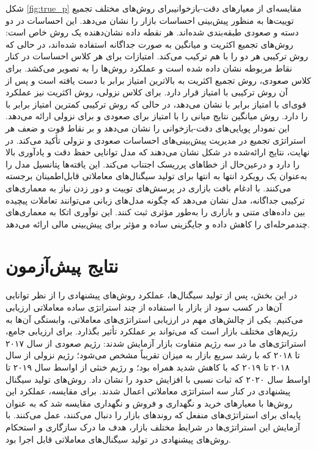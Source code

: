  شکل \ref{fig:true_p} مقایسه‌ای از معیارهای دقت-بازخوانیبرای روش‌های مختلف تجمیع توییت‌ها به منظور پیش‌بینی احساسات بازار را نشان می‌دهد. این احساسات در دو دسته  و صعودی طبقه‌بندی شده‌اند. هر نقطه داده نشان‌دهنده یک روش خاص است: روش‌های تجمیع اکثریت و میانگین به صورت جداگانه استفاده شده‌اند، در حالی که روش ترکیبی هر دو را با هم ترکیب می‌کند. امتیازات  برای هر کلاس احساسات در کنار نقاط مربوطه نشان داده شده است و عملکرد روش‌ها را به تصویر می‌کشد. برای کلاس صعودی، روش تجمیع اکثریت به بالاترین امتیاز  برابر با  دست یافته است و پس از آن روش ترکیبی با امتیاز  قرار دارد. برای کلاس نزولی، روش اکثریت نیز عملکرد قوی‌ای با امتیاز  برابر با  نشان می‌دهد، در حالی که روش ترکیبی کمترین امتیاز  برابر با  را دارد. روش میانگین نتایج میانی را با امتیاز  برای صعودی و  برای نزولی ارائه می‌دهد. این نمودار پویایی‌های دقت-بازخوانی را نشان می‌دهد و بر نقاط قوت و ضعف هر استراتژی تجمیع در مدیریت پیش‌بینی‌های احساسات صعودی و نزولی تأکید می‌کند. در نهایت، نتایج ارائه‌شده در شکل نشان می‌دهند که مدل  توانایی حفظ دقت و یادآوری بالا را دارد و درعین‌حال از خطاهای پرریسک اجتناب می‌کند. این یافته‌ها پتانسیل مدل  را به‌عنوان یک رویکرد انتها به انتها برای تولید سیگنال‌های معاملاتی قابل‌اطمینان برجسته می‌کنند. با ادغام بافت بازاری در پرسش‌های توییت و دور زدن نیاز به معماری‌های ترکیبی جداگانه، مدل  نشان می‌دهد که چگونه مدل‌های زبانی می‌توانند تعاملات پیچیده بین داده‌های متنی و بازاری را به‌طور مؤثری ثبت کنند. این نوآوری اتکا به معماری‌های چندمرحله‌ای را کاهش داده و جایگزینی ساده و مؤثر برای پیش‌بینی مالی ارائه می‌دهد.


\section{نتایج پیش‌آزمون}
در این بخش، پس از تولید سیگنال‌ها، عملکرد روش‌های پیشنهادی را از نظر توانایی آن‌ها در کسب سود از بازار با استفاده از چند استراتژی ساده معاملاتی ارزیابی می‌کنیم. یکی از چالش‌های مهم در ارزیابی استراتژی‌های معاملاتی، وابستگی آن‌ها به رژیم‌های مختلف بازار است که می‌تواند بر عملکرد تأثیر بگذارد. برای ارزیابی جامع، استراتژی‌های ما در سه رژیم متفاوت بازار آزمایش شدند: رژیم صعودی از سال ۲۰۱۷ تا ۲۰۱۸ که با رشد سریع بازار به میزان تقریباً  مشخص می‌شود؛ رژیم نزولی از سال ۲۰۱۸ تا ۲۰۱۹ که با کاهش شدید  همراه بود؛ و رژیم خنثی از اواسط سال ۲۰۱۹ تا اواسط سال ۲۰۲۰ که ثبات نسبی با افزایش حدود  را نشان داد. روش‌های تولید سیگنال پیشنهادی در کنار سه استراتژی معاملاتی اعمال شدند. برای مقایسه، عملکرد این روش‌ها با معیارهای خرید و نگهداری و فروش و نگهداری مقایسه شد که به عنوان پایه‌ای برای استراتژی‌های منفعل که روندهای بازار را دنبال می‌کنند، عمل می‌کنند. با آزمایش این استراتژی‌ها در شرایط مختلف بازار، هدف ما درک سازگاری و استحکام روش‌های پیشنهادی در تولید سیگنال‌های معاملاتی قابل اجرا بود.

